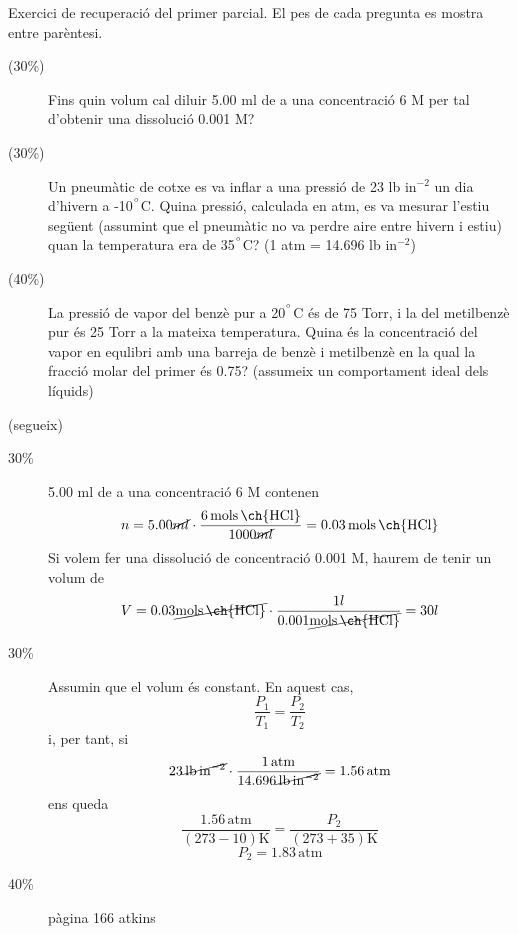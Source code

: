 \documentclass[11pt]{article}
\begin{document}
{
Exercici de recuperació del primer parcial. El pes de cada pregunta es mostra entre parèntesi.
\begin{description}
\item[(30\%)] Fins quin volum cal diluir 5.00 ml de  a una concentració 6 M per tal d'obtenir una dissolució 0.001 M?
\item[(30\%)] Un pneumàtic de cotxe es va inflar a una pressió de 23 lb in$^{-2}$ un dia d'hivern a -10$^{\degree}$C. Quina pressió, calculada en atm, es va mesurar l'estiu següent (assumint que el pneumàtic no  va perdre aire entre hivern i estiu) quan la temperatura era de 35$^{\degree}$C? (1 atm = 14.696 lb in$^{-2}$)
\item[(40\%)] La pressió de vapor del benzè pur a 20$^{\degree}$C és de 75 Torr, i la del metilbenzè pur és 25 Torr a la mateixa temperatura. Quina és la concentració del vapor en equlibri amb una barreja de benzè i metilbenzè en la qual la fracció molar del primer és 0.75? (assumeix un comportament ideal dels líquids)
\end{description}
}
{
\vfill
\newpage (segueix) \newpage
}
{
\begin{description}
\item[30\%]  5.00 ml de  a una concentració 6 M contenen 
\[n=5.00 \cancel{ml}  \cdot \frac{6 \mathrm{\, mols \, \ch{HCl}} }{1000 \cancel{ml}}=0.03 \mathrm{\, mols \, \ch{HCl}} \]
Si volem fer una dissolució de concentració 0.001 M, haurem de tenir un volum de
\[V=0.03 \cancel{\mathrm{mols \, \ch{HCl}}} \cdot \frac{1 l}{0.001 \cancel{\mathrm{mols \, \ch{HCl}}}}=30l\]
\item[30\%] Assumin que el volum és constant. En aquest cas, 
\[\frac{P_1}{T_1}=\frac{P_2}{T_2}\]
i, per tant, si
\[23 \cancel{\mathrm{\, lb \, in^{-2}}} \cdot \frac{1 \mathrm{\, atm}}{14.696 \cancel{\mathrm{\, lb \, in^{-2}}}}= 1.56\mathrm{\, atm}\]
ens queda
\[\frac{1.56\mathrm{\, atm}}{(273-10)\mathrm{K}}=\frac{P_2}{(273+35)\mathrm{K}}\]
\[P_2 = 1.83 \mathrm{\, atm}\]
\item[40\%] pàgina 166 atkins
\end{description}
}
\end{document}
